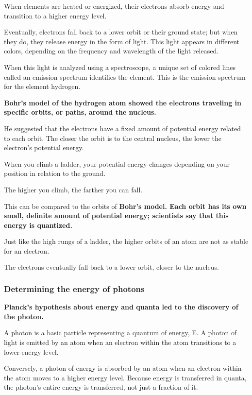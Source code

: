 
\begin{definition}
    When elements are heated or energized, their electrons absorb energy and transition to a higher energy level.
\end{definition}

Eventually, electrons fall back to a lower orbit or their ground state; but when they do, they release energy in the form of light. This light appears in different colors, depending on the frequency and wavelength of the light released.

When this light is analyzed using a spectroscope, a unique set of colored lines called an emission spectrum identifies the element. This is the emission spectrum for the element hydrogen.

\bf{Bohr's model} of the hydrogen atom showed the electrons traveling in specific orbits, or paths, around the nucleus.

He suggested that the electrons have a fixed amount of potential energy related to each orbit. The closer the orbit is to the central nucleus, the lower the electron's potential energy.

When you climb a ladder, your potential energy changes depending on your position in relation to the ground.

The higher you climb, the farther you can fall.

This can be compared to the orbits of \bf{Bohr's model}. Each orbit has its own small, definite amount of potential energy; scientists say that this energy is quantized.

Just like the high rungs of a ladder, the higher orbits of an atom are not as stable for an electron.

The electrons eventually fall back to a lower orbit, closer to the nucleus.

\subsubsection*{Determining the energy of photons}

\bf{Planck's hypothesis} about energy and quanta led to the discovery of the \bf{photon}.

\begin{definition}[Photon]
    A photon is a basic particle representing a quantum of energy, E. A photon of light is emitted by an atom when an electron within the atom transitions to a lower energy level.
    
    Conversely, a photon of energy is absorbed by an atom when an electron within the atom moves to a higher energy level. Because energy is transferred in quanta, the photon's entire energy is transferred, not just a fraction of it.
\end{definition}

